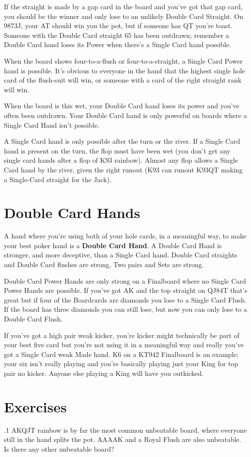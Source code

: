 If the straight is made by a gap card in the board and you've got that
gap card, you should be the winner and only lose to an unlikely Double
Card Straight. On 9873J, your AT should win you the pot, but if
someone has QT you're toast. Someone with the Double Card straight 65
has been outdrawn; remember a Double Card hand loses its Power when
there's a Single Card hand possible.

When the board shows four-to-a-flush or four-to-a-straight, a Single
Card Power hand is possible. It's obvious to everyone in the hand that
the highest single hole card of the flush-suit will win, or someone
with a card of the right straight rank will win.

When the board is this wet, your Double Card hand loses its power and
you've often been outdrawn. Your Double Card hand is only powerful on
boards where a Single Card Hand isn't possible.

A Single Card hand is only possible after the turn or the river. If a
Single Card hand is present on the turn, the flop must have been wet
(you don't get any single card hands after a flop of K93
rainbow). Almost any flop allows a Single Card hand by the river,
given the right runout (K93 can runout K93QT making a Single-Card
straight for the Jack).

\section{Double Card Hands}

A hand where you're using both of your hole cards, in a meaningful
way, to make your best poker hand is a \textbf{Double Card
Hand}. A Double Card Hand is stronger, and more deceptive, than a
Single Card hand. Double Card straights and Double Card flushes are
strong, Two pairs and Sets are strong.

Double Card Power Hands are only strong on a Finalboard where no
Single Card Power Hands are possible. If you've got AK and the top
straight on QJ84T that's great but if four of the Boardcards are
diamonds you lose to a Single Card Flush. If the board has three
diamonds you can still lose, but now you can only lose to a Double
Card Flush.

If you've got a high pair weak kicker, you're kicker might technically
be part of your best five card but you're not using it in a meaningful
way and really you've got a Single Card weak Made hand. K6 on a KT942
Finalboard is an example; your six isn't really playing and you're
basically playing just your King for top pair no kicker. Anyone else
playing a King will have you outkicked.

\section{Exercises}

.1 AKQJT rainbow is by far the most common unbeatable
board, where everyone still in the hand splits the pot. AAAAK and a
Royal Flush are also unbeatable. Is there any other unbeatable board?
